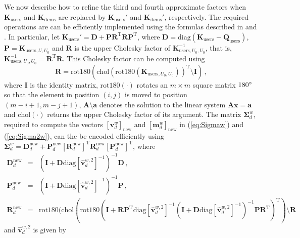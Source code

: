 \documentclass{article}
\begin{document}
We now describe how to refine the third and fourth approximate factors when $\mathbf{K}_\text{users}$ and
$\mathbf{K}_\text{items}$ are replaced by $\mathbf{K}_\text{users}'$ and $\mathbf{K}_\text{items}'$, respectively.
The required operations are can be efficiently implemented using the formulas
described in \citep{Guzman2007} and \citep{Lazaro2010}.
In particular, let $\mathbf{K}_\text{users}' = \mathbf{D} + \mathbf{P}
\mathbf{R}^\text{T} \mathbf{R} \mathbf{P}^\text{T}$,
where $\mathbf{D} = \text{diag}(\mathbf{K}_\text{users}-\mathbf{Q}_\text{users})$,
$\mathbf{P} = \mathbf{K}_{\text{users},U,U_0}$ and
$\mathbf{R}$ is the upper Cholesky factor of $\mathbf{K}_{\text{users},U_0,U_0}^{-1}$, that is,
$\mathbf{K}_{\text{users},U_0,U_0}^{-1} = \mathbf{R}^\text{T} \mathbf{R}$.
This Cholesky factor can be computed using
\begin{equation}
\mathbf{R} = \text{rot180}(\text{chol}(\text{rot180}(\mathbf{K}_{\text{users},U_0,U_0}))^\text{T} \setminus \mathbf{I})\,,
\end{equation}
where $\mathbf{I}$ is the identity matrix, $\text{rot180}(\cdot)$ rotates an $m \times m$ square matrix $180\degree$
so that the element in position $(i,j)$ is moved to position $(m - i + 1, m - j + 1)$,
$\mathbf{A} \setminus \mathbf{a}$ denotes the solution to the linear system $\mathbf{A} \mathbf{x} = \mathbf{a}$ and
$\text{chol}(\cdot)$ returns the upper Cholesky factor of its argument.
The matrix $\bm \Sigma_d^w $, required to compute the vectors $[\mathbf{v}_{d}^{w}]_\text{new}$ and $[\mathbf{m}_{d}^{w}]_\text{new}$
in (\ref{eq:Sigmaw}) and (\ref{eq:Sigma2w}), can the be encoded efficiently using
$\bm \Sigma_d^w = \mathbf{D}^\text{new}_d + \mathbf{P}^\text{new}_d
[\mathbf{R}^\text{new}_d]^\text{T} \mathbf{R}^\text{new}_d [\mathbf{P}^\text{new}_d]^\text{T}$,
where
\begin{eqnarray}
\mathbf{D}^\text{new}_d & = & \left(\mathbf{I} + \mathbf{D}
\text{diag}[\hat{\mathbf{v}}_d^{w,2}]^{-1} \right)^{-1} \mathbf{D}\,,\\
\mathbf{P}^\text{new}_d & = & \left(\mathbf{I} + \mathbf{D}
\text{diag}[\hat{\mathbf{v}}_d^{w,2}]^{-1} \right)^{-1} \mathbf{P}\,,\\
\mathbf{R}^\text{new}_d & = & \text{rot180}(\text{chol}(\text{rot180}(\mathbf{I} + 
\mathbf{R} \mathbf{P}^\text{T} \text{diag}[\hat{\mathbf{v}}_d^{w,2}]^{-1}
(\mathbf{I} + \mathbf{D} \text{diag}[\hat{\mathbf{v}}_d^{w,2}]^{-1})^{-1}
\mathbf{P} \mathbf{R}^\text{T})^\text{T}) \setminus \mathbf{R}
\end{eqnarray}
and $\hat{\mathbf{v}}_d^{w,2}$ is given by
\end{document}
